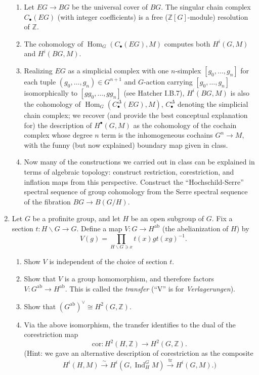 \documentclass[11pt,answers,addpoints,reqno]{exam}
\theoremstyle{definition}
\theoremstyle{remark}
\theoremstyle{definition}
\theoremstyle{remark}
\theoremstyle{remark}
\theoremstyle{remark}
\newcommand{\Z}{\mathbb{Z}}
\DeclareMathOperator{\Hom}{Hom}
\DeclareMathOperator{\Ind}{Ind}
\DeclareMathOperator{\tr}{tr}
\newcommand{\mr}{\mathrm}
\begin{document}
\begin{enumerate}
\begin{enumerate}
\item Let $EG \to BG$ be the universal cover of $BG$. The singular chain complex $C_{\bullet}(EG)$ (with integer coefficients) is a free ($\Z[G]$-module) resolution of $\Z$. 
\item The cohomology of $\Hom_G(C_{\bullet}(EG), M)$ computes both $H^i(G, M)$ and $H^i(BG, M)$.
\item Realizing $EG$ as a simplicial complex with one $n$-simplex $[g_0, \ldots, g_n]$ for each tuple $(g_0, \ldots, g_n) \in G^{n+1}$ and $G$-action carrying $[g_0, \ldots, g_n]$ isomorphically to $[gg_0, \ldots, gg_n]$ (see Hatcher I.B.7), $H^i(BG, M)$ is also the cohomology of $\Hom_G(C^{\Delta}_{\bullet}(EG), M)$, $C^{\Delta}_{\bullet}$ denoting the simplicial chain complex; we recover (and provide the best conceptual explanation for) the description of $H^\bullet(G, M)$ as the cohomology of the cochain complex whose degree $n$ term is the inhomogeneous cochains $G^n \to M$, with the funny (but now explained) boundary map given in class.
\item Now many of the constructions we carried out in class can be explained in terms of algebraic topology: construct restriction, corestriction, and inflation maps from this perspective. Construct the ``Hochschild-Serre'' spectral sequence of group cohomology from the Serre spectral sequence of the fibration $BG \to B(G/H)$.
\end{enumerate}
\item Let $G$ be a profinite group, and let $H$ be an open subgroup of $G$. Fix a section $t \colon H \backslash G \to G$. Define a map $V \colon G \to H^{\mr{ab}}$ (the abelianization of $H$) by
\[
V(g)= \prod_{H \backslash G \ni x} t(x)gt(xg)^{-1}.
\]
\begin{enumerate}
\item Show $V$ is independent of the choice of section $t$.
\item Show that $V$ is a group homomorphism, and therefore factors $V \colon G^{\mr{ab}} \to H^{\mr{ab}}$. This is called the \textit{transfer} (``V'' is for \textit{Verlagerungen}).
\item Show that $(G^{\mr{ab}})^\vee \cong H^2(G, \Z)$.
\item Via the above isomorphism, the transfer identifies to the dual of the corestriction map 
\[
\mr{cor} \colon H^2(H, \Z) \to H^2(G, \Z).
\]
(Hint: we gave an alternative description of corestriction as the composite
\[
H^i(H, M) \xrightarrow{\sim} H^i(G, \Ind_H^G M) \xrightarrow{\tr} H^i(G, M).)
\]
\end{enumerate}
\end{enumerate}
\end{document}
